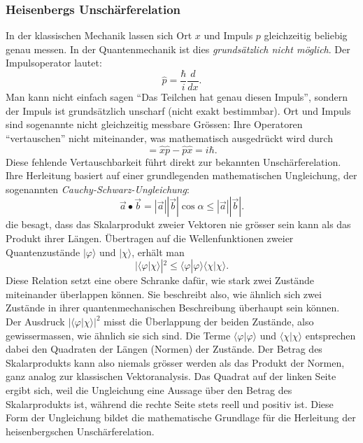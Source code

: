 \subsubsection{Heisenbergs Unschärferelation%
\label{fourier:subsubsection:unschaerferelation}}
%
%
In der klassischen Mechanik lassen sich Ort $x$ und Impuls $p$ gleichzeitig beliebig genau messen.
In der Quantenmechanik ist dies \emph{grundsätzlich nicht möglich}.
Der Impulsoperator lautet:
\begin{equation}
	\hat{p} = \frac{\hbar}{i} \frac{d}{dx}.
\end{equation}
Man kann nicht einfach sagen ``Das Teilchen hat genau diesen Impuls'', sondern der Impuls ist grundsätzlich unscharf (nicht exakt bestimmbar).
Ort und Impuls sind sogenannte nicht gleichzeitig messbare Grössen:
Ihre Operatoren ``vertauschen'' nicht miteinander, was mathematisch ausgedrückt wird durch
\begin{equation}
	[\hat{x},\hat{p}] = \hat{x} \hat{p} - \hat{p} \hat{x} = i \hbar.
\end{equation}
Diese fehlende Vertauschbarkeit führt direkt zur bekannten Unschärferelation.
Ihre Herleitung basiert auf einer grundlegenden mathematischen Ungleichung, der sogenannten \emph{Cauchy-Schwarz-Ungleichung}:
%
\begin{equation}\label{fourier:equation:CauchySchwarzUngleichung}
	\vec{a} \bullet \vec{b} = |\vec{a}| |\vec{b}|\cos\alpha \le |\vec{a}| |\vec{b}|.
\end{equation}
die besagt, dass das Skalarprodukt zweier Vektoren nie grösser sein kann als das Produkt ihrer Längen.
Übertragen auf die Wellenfunktionen zweier Quantenzustände $|\varphi\rangle$ und $|\chi\rangle$, erhält man
\begin{equation}
	|\langle\varphi | \chi\rangle|^2 \le \langle\varphi | \varphi\rangle \langle\chi | \chi\rangle.
\end{equation}
Diese Relation setzt eine obere Schranke dafür, wie stark zwei Zustände miteinander überlappen können.
Sie beschreibt also, wie ähnlich sich zwei Zustände in ihrer quantenmechanischen Beschreibung überhaupt sein können.
Der Ausdruck $|\langle\varphi|\chi\rangle|^2$ misst die Überlappung der beiden Zustände, also gewissermassen, wie ähnlich sie sich sind.
Die Terme $\langle\varphi|\varphi\rangle$ und $\langle\chi|\chi\rangle$ entsprechen dabei den Quadraten der Längen (Normen) der Zustände.
Der Betrag des Skalarprodukts kann also niemals grösser werden als das Produkt der Normen, ganz analog zur klassischen Vektoranalysis.
Das Quadrat auf der linken Seite ergibt sich, weil die Ungleichung eine Aussage über den Betrag des Skalarprodukts ist, während die rechte Seite stets reell und positiv ist.
Diese Form der Ungleichung bildet die mathematische Grundlage für die Herleitung der heisenbergschen Unschärferelation.


